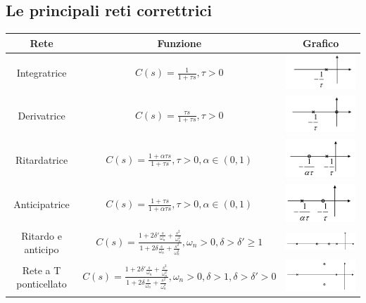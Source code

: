 \subsection{Le principali reti correttrici}
\begin{table}[h!]
  \centering
  \begin{tabular}{|c|c|c|}
    \hline
    Rete & Funzione & Grafico \\
    \hline
    \hline
    Integratrice & $C(s) = \frac{1}{1 + \tau s}, \tau > 0$ & \includegraphics[width=0.15\linewidth]{./images/rete_integratrice.png} \\
    \hline
    Derivatrice & $C(s) = \frac{\tau s}{1 + \tau s}, \tau > 0$ & \includegraphics[width=0.15\linewidth]{./images/rete_derivatrice.png} \\
    \hline
    Ritardatrice & $C(s) = \frac{1 + \alpha \tau s}{1 + \tau s}, \tau > 0, \alpha \in (0, 1)$ & \includegraphics[width=0.15\linewidth]{./images/rete_ritardatrice.png} \\
    \hline
    Anticipatrice & $C(s) = \frac{1 + \tau s}{1 + \alpha \tau s}, \tau > 0, \alpha \in (0, 1)$ & \includegraphics[width=0.15\linewidth]{./images/rete_anticipatrice.png} \\
    \hline
    Ritardo e anticipo & $C(s) = \frac{1 + 2 \delta' \frac{s}{\omega_n} + \frac{s^2}{\omega^2_n}}{1 + 2 \delta \frac{s}{\omega_n} + \frac{s^2}{\omega^2_n}}, \omega_n > 0, \delta > \delta' \geq 1$ & \includegraphics[width=0.15\linewidth]{./images/rete_ritardo_anticipo.png} \\
    \hline
    Rete a T ponticellato & $C(s) = \frac{1 + 2 \delta' \frac{s}{\omega_n} + \frac{s^2}{\omega^2_n}}{1 + 2 \delta \frac{s}{\omega_n} + \frac{s^2}{\omega^2_n}}, \omega_n > 0, \delta > 1,  \delta > \delta' > 0$ & \includegraphics[width=0.15\linewidth]{./images/rete_t_ponticellato.png} \\
    \hline
  \end{tabular}
\end{table}

